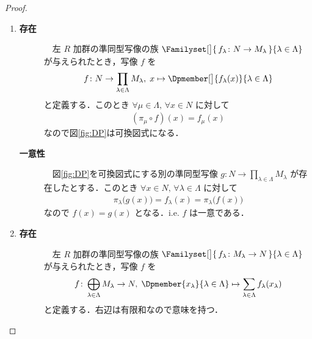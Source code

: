 \documentclass[geometry_main]{subfiles}
\begin{document}
\begin{proof}
	\begin{enumerate}
		\item 
		\begin{description}
			\item[\textbf{存在}]　左 $R$ 加群の準同型写像の族 $\Familyset[\big]{\, f_\lambda \colon N \to M_\lambda\,}{\lambda\in\Lambda}$ が与えられたとき，写像 $f$ を
			\begin{align}
				f \colon N \to \prod_{\lambda\in\Lambda}M_\lambda,\; x \mapsto \Dpmember[\big]{f_\lambda(x)}{\lambda\in\Lambda}
			\end{align}
			と定義する．このとき $\forall \mu \in \Lambda,\,\forall x \in N$ に対して
			\begin{align}
				(\pi_\mu \circ f)(x) = f_\mu(x)
			\end{align}
			なので図\ref{fig:DP}は可換図式になる．
			\item[\textbf{一意性}]　図\ref{fig:DP}を可換図式にする別の準同型写像 $g \colon N \to \displaystyle \prod_{\lambda\in\Lambda}M_\lambda$ が存在したとする．このとき $\forall x \in N,\,\forall \lambda \in \Lambda$ に対して
			\begin{align}
				\pi_\lambda \bigl( g(x) \bigr) = f_\lambda(x) = \pi_\lambda \bigl( f(x) \bigr) 
			\end{align}
			なので $f(x) = g(x)$ となる．i.e. $f$ は一意である．
		\end{description}
		\item 
		\begin{description}
			\item[\textbf{存在}]　左 $R$ 加群の準同型写像の族 $\Familyset[\big]{\, f_\lambda \colon M_\lambda \to N\,}{\lambda\in\Lambda}$ が与えられたとき，写像 $f$ を
			\begin{align}
				f \colon \bigoplus_{\lambda\in\Lambda} M_\lambda \to N,\; \Dpmember{x_\lambda}{\lambda\in\Lambda} \mapsto \sum_{\lambda \in \Lambda} f_\lambda(x_\lambda)
			\end{align}
			と定義する．右辺は有限和なので意味を持つ．


\end{description}
\end{enumerate}
\end{proof}
\end{document}
